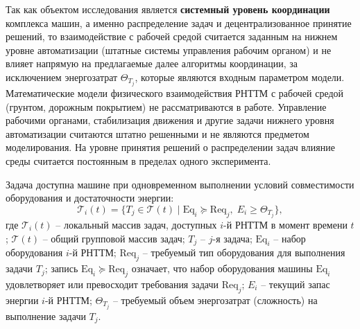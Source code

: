 Так как объектом исследования является \textbf{системный уровень координации} комплекса машин, а именно распределение задач и децентрализованное принятие решений, то взаимодействие с рабочей средой считается заданным на нижнем уровне автоматизации (штатные системы управления рабочим органом) и не влияет напрямую на предлагаемые далее алгоритмы координации, за исключением энергозатрат \( \Theta_{T_j} \), которые являются входным параметром модели. Математические модели физического взаимодействия РНТТМ с рабочей средой (грунтом, дорожным покрытием) не рассматриваются в работе. Управление рабочими органами, стабилизация движения и другие задачи нижнего уровня автоматизации считаются штатно решенными и не являются предметом моделирования. На уровне принятия решений о распределении задач влияние среды считается постоянным в пределах одного эксперимента.

Задача доступна машине при одновременном выполнении условий совместимости оборудования и достаточности энергии:
\begin{equation}
\mathcal{T}_i(t) = \{T_j \in \mathcal{T}(t) \mid \text{Eq}_i \succeq \text{Req}_j,\; E_i \ge \Theta_{T_j}\},
\end{equation}
где $\mathcal{T}_i(t)$ -- локальный массив задач, доступных $i$-й РНТТМ в момент времени $t$; $\mathcal{T}(t)$ -- общий групповой массив задач; $T_j$ -- $j$-я задача; $\text{Eq}_i$ -- набор оборудования $i$-й РНТТМ; $\text{Req}_j$ -- требуемый тип оборудования для выполнения задачи $T_j$; запись $ \text{Eq}_i \succeq \text{Req}_j $ означает, что набор оборудования машины $ \text{Eq}_i $ удовлетворяет или превосходит требования задачи $ \text{Req}_j $; $E_i$ -- текущий запас энергии $i$-й РНТТМ; $ \Theta_{T_j} $ -- требуемый объем энергозатрат (сложность) на выполнение задачи $ T_j $.

